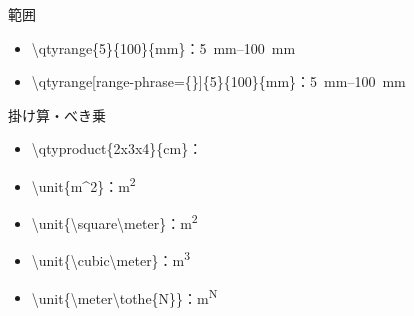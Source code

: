 \documentclass[11pt]{jsarticle}
\begin{document}
範囲

\begin{itemize}
  \item \textbackslash qtyrange\{5\}\{100\}\{mm\}：\qtyrange{5}{100}{mm}
  \item \textbackslash qtyrange[range-phrase=\{\text{-}\text{-}\}]\{5\}\{100\}\{mm\}：\qtyrange[range-phrase={--}]{5}{100}{mm}
\end{itemize}

掛け算・べき乗

\begin{itemize}
  \item \textbackslash qtyproduct\{2x3x4\}\{cm\}：
  \item \textbackslash unit\{m\textasciicircum2\}：\unit{m^2}
  \item \textbackslash unit\{\textbackslash square\textbackslash meter\}：\unit{\square\meter}
  \item \textbackslash unit\{\textbackslash cubic\textbackslash meter\}：\unit{\cubic\meter}
  \item \textbackslash unit\{\textbackslash meter\textbackslash tothe\{N\}\}：\unit{\meter\tothe{N}}
\end{itemize}
\end{document}
